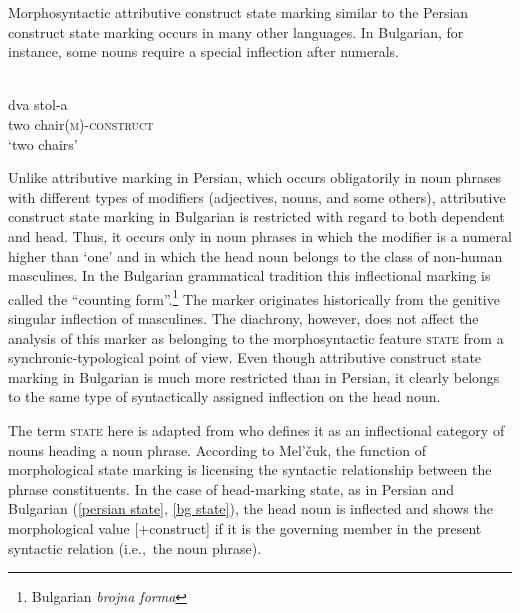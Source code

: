 Morphosyntactic attributive construct state marking similar to the Persian construct state marking occurs in many other languages. In Bulgarian, for instance, some nouns require a special inflection after numerals.
\begin{exe}
\ex 
{}\\
\label{bg state}
\gll 	dva 	stol-a\\
	two	chair{\textsc{(m)-construct}}\\
\glt 	‘two chairs’
\end{exe}
Unlike attributive  marking in Persian, which occurs obligatorily in noun phrases with different types of modifiers (adjectives, nouns, and some others), attributive construct state marking in Bulgarian is restricted with regard to both dependent and head. Thus, it occurs only in noun phrases in which the modifier is a numeral higher than ‘one’ and in which the head noun belongs to the class of non-human masculines. In the Bulgarian grammatical tradition this inflectional marking is called the “counting form”.\footnote{Bulgarian \textit{brojna forma}} The marker originates historically from the genitive singular inflection of masculines. The diachrony, however, does not affect the analysis of this marker as belonging to the morphosyntactic feature \textsc{state} from a synchronic-typological point of view. Even though attributive construct state marking in Bulgarian is much more restricted than in Persian, it clearly belongs to the same type of syntactically assigned inflection on the head noun.

The term \textsc{state} here is adapted from \citet[114–116]{melcuk2006} who defines it as an inflectional category of nouns heading a noun phrase. According to Mel'čuk, the function of morphological state marking is licensing the syntactic relationship between the phrase constituents. In the case of head-marking state, as in Persian and Bulgarian (\ref{persian state}, \ref{bg state}), the head noun is inflected and shows the morphological value [+construct] if it is the governing member in the present syntactic relation (i.e.,~the noun phrase). 

